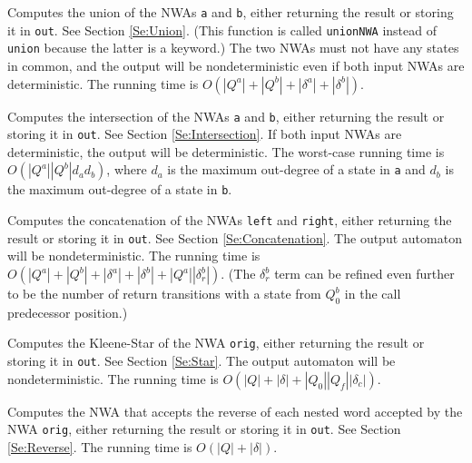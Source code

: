\begin{functionlist}

    Computes the union of the NWAs \texttt{a} and \texttt{b},
    either returning the result or storing it in \texttt{out}.
    See Section
    \ref{Se:Union}. (This function is called \texttt{unionNWA} instead of
    \texttt{union} because the latter is a keyword.) The two NWAs must not
    have any states in common, and the output will be nondeterministic even
    if both input NWAs are deterministic. The running time is
    $O(|Q^a|+|Q^b|+|\delta^a|+|\delta^b|)$.

    Computes the intersection of the NWAs \texttt{a} and \texttt{b},
    either returning the result or storing it in \texttt{out}.
    See Section \ref{Se:Intersection}. If both input NWAs are deterministic,
    the output will be deterministic. The worst-case running time is
    $O(|Q^a||Q^b|d_ad_b)$, where $d_a$ is the maximum out-degree
    of a state in \texttt{a} and $d_b$ is the maximum out-degree of a state
    in \texttt{b}.

    Computes the concatenation of the NWAs \texttt{left} and
    \texttt{right}, either returning the result or storing it in
    \texttt{out}.
    See Section \ref{Se:Concatenation}. The output automaton will be
    nondeterministic. The running time is
    $O(|Q^a|+|Q^b|+|\delta^a|+|\delta^b|+|Q^a||\delta_r^b|)$.
    (The $\delta_r^b$ term can be refined even further to be the number of
    return transitions with a state from $Q_0^b$ in the call predecessor
    position.)

    Computes the Kleene-Star of the NWA \texttt{orig}, either
    returning the result or storing it in \texttt{out}. See Section
    \ref{Se:Star}. The output automaton will be nondeterministic. The
    running time is $O(|Q|+|\delta|+|Q_0||Q_f||\delta_c|)$.

    Computes the NWA that accepts the reverse of each nested word
    accepted by the NWA \texttt{orig}, either returning the result or
    storing it in \texttt{out}. See Section \ref{Se:Reverse}. The running
    time is $O(|Q|+|\delta|)$.


\end{functionlist}
